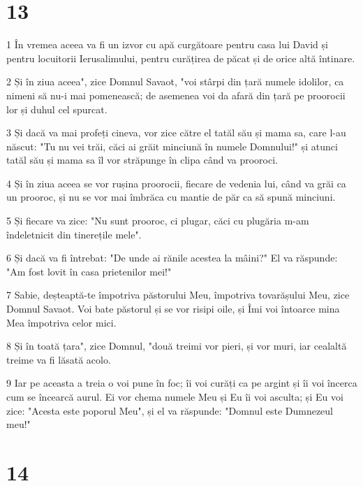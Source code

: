 \chapter{13}

\par 1 În vremea aceea va fi un izvor cu apă curgătoare pentru casa lui David și pentru locuitorii Ierusalimului, pentru curățirea de păcat și de orice altă întinare.
\par 2 Și în ziua aceea", zice Domnul Savaot, "voi stârpi din țară numele idolilor, ca nimeni să nu-i mai pomenească; de asemenea voi da afară din țară pe proorocii lor și duhul cel spurcat.
\par 3 Și dacă va mai profeți cineva, vor zice către el tatăl său și mama sa, care l-au născut: "Tu nu vei trăi, căci ai grăit minciună în numele Domnului!" și atunci tatăl său și mama sa îl vor străpunge în clipa când va prooroci.
\par 4 Și în ziua aceea se vor rușina proorocii, fiecare de vedenia lui, când va grăi ca un prooroc, și nu se vor mai îmbrăca cu mantie de păr ca să spună minciuni.
\par 5 Și fiecare va zice: "Nu sunt prooroc, ci plugar, căci cu plugăria m-am îndeletnicit din tinerețile mele".
\par 6 Și dacă va fi întrebat: "De unde ai rănile acestea la mâini?" El va răspunde: "Am fost lovit în casa prietenilor mei!"
\par 7 Sabie, deșteaptă-te împotriva păstorului Meu, împotriva tovarășului Meu, zice Domnul Savaot. Voi bate păstorul și se vor risipi oile, și Îmi voi întoarce mina Mea împotriva celor mici.
\par 8 Și în toată țara", zice Domnul, "două treimi vor pieri, și vor muri, iar cealaltă treime va fi lăsată acolo.
\par 9 Iar pe aceasta a treia o voi pune în foc; îi voi curăți ca pe argint și îi voi încerca cum se încearcă aurul. Ei vor chema numele Meu și Eu îi voi asculta; și Eu voi zice: "Acesta este poporul Meu", și el va răspunde: "Domnul este Dumnezeul meu!"

\chapter{14}

